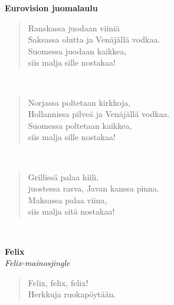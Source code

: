 \noindent\begin{minipage}{\linewidth}
\vspace{5pt}
\parbox[t]{0.85\linewidth}{\raggedright {\large\bf Eurovision juomalaulu}\\[6pt]}
\begin{verse}
	Ranskassa juodaan viiniä\\
	Saksassa olutta ja Venäjällä vodkaa.\\
	Suomessa juodaan kaikkea,\\
	siis malja sille nostakaa!\\
\end{verse}
\end{minipage}\\[10pt]
\noindent\begin{minipage}{\linewidth}
\begin{verse}
	Norjassa poltetaan kirkkoja,\\
	Hollannissa pilveä ja Venäjällä vodkaa.\\
	Suomessa poltetaan kaikkea,\\
	siis malja sille nostakaa!\\
\end{verse}
\end{minipage}\\[10pt]
\noindent\begin{minipage}{\linewidth}
\begin{verse}
	Grillissä palaa hiili,\\
	juostessa rasva, Javan kanssa pinna.\\
	Maksassa palaa viina,\\
	siis malja sitä nostakaa!\\
\end{verse}
\end{minipage}\\[10pt]
%
%
\noindent\begin{minipage}{\linewidth}
\vspace{5pt}
\parbox[t]{0.85\linewidth}{\raggedright {\large\bf Felix}\\[2pt]\small\emph{Felix-mainosjingle}\\[6pt]}
\begin{verse}
	
	Felix, felix, felix!\\
	Herkkuja ruokapöytään.\\
\end{verse}
\end{minipage}\\[10pt]
